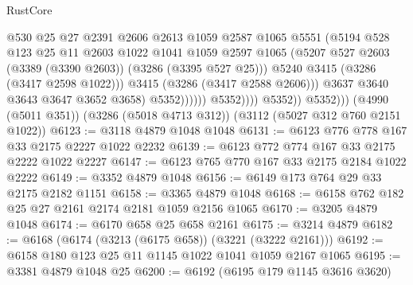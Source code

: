 \begin{lexlean}{RustCore}
\begin{coremodule}
                                      @530
                                      @25
                                      @27
                                      @2391
                                      @2606
                                      @2613
                                      @1059
                                      @2587
                                      @1065
                                      @5551
                                      (@5194
                                        @528
                                        @123
                                        @25
                                        @11
                                        @2603
                                        @1022
                                        @1041
                                        @1059
                                        @2597
                                        @1065
                                        (@5207
                                          @527
                                          @2603
                                          (@3389 (@3390 @2603))
                                          (@3286 (@3395 @527 @25)))
                                        @5240
                                        @3415
                                        (@3286 (@3417 @2598 @1022)))
                                      @3415
                                      (@3286 (@3417 @2588 @2606)))
                                    @3637
                                    @3640
                                    @3643
                                    @3647
                                    @3652
                                    @3658)
                                  @5352))))))
                      @5352))))
              @5352))
          @5352)))
    (@4990 (@5011 @351))
    (@3286 (@5018 @4713 @312))
    (@3112 (@5027 @312 @760 @2151 @1022))
@6123 := @3118 @4879 @1048 @1048
@6131 := @6123 @776 @778 @167 @33 @2175 @2227 @1022 @2232
@6139 := @6123 @772 @774 @167 @33 @2175 @2222 @1022 @2227
@6147 := @6123 @765 @770 @167 @33 @2175 @2184 @1022 @2222
@6149 := @3352 @4879 @1048
@6156 := @6149 @173 @764 @29 @33 @2175 @2182 @1151
@6158 := @3365 @4879 @1048
@6168 := @6158 @762 @182 @25 @27 @2161 @2174 @2181 @1059 @2156 @1065
@6170 := @3205 @4879 @1048
@6174 := @6170 @658 @25 @658 @2161
@6175 := @3214 @4879
@6182 := @6168 (@6174 (@3213 (@6175 @658)) (@3221 (@3222 @2161)))
@6192 := @6158 @180 @123 @25 @11 @1145 @1022 @1041 @1059 @2167 @1065
@6195 := @3381 @4879 @1048 @25
@6200 := @6192 (@6195 @179 @1145 @3616 @3620)

\end{coremodule}
\end{lexlean}
